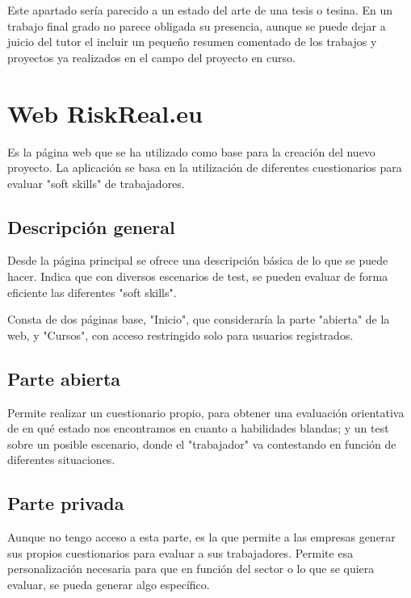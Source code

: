 
Este apartado sería parecido a un estado del arte de una tesis o tesina. En un trabajo final grado no parece obligada su presencia, aunque se puede dejar a juicio del tutor el incluir un pequeño resumen comentado de los trabajos y proyectos ya realizados en el campo del proyecto en curso. 

\section{Web RiskReal.eu}
Es la página web \cite{web:riskreal} que se ha utilizado como base para la creación del nuevo proyecto.
La aplicación se basa en la utilización de diferentes cuestionarios para evaluar "soft skills" de trabajadores.

\subsection{Descripción general}
Desde la página principal se ofrece una descripción básica de lo que se puede hacer.
Indica que con diversos escenarios de test, se pueden evaluar de forma eficiente las diferentes "soft skills".

Consta de dos páginas base, "Inicio", que consideraría la parte "abierta" de la web, y "Cursos", con acceso restringido solo para usuarios registrados.

\subsection{Parte abierta}
Permite realizar un cuestionario propio, para obtener una evaluación orientativa de en qué estado nos encontramos en cuanto a habilidades blandas; y un test sobre un posible escenario, donde el "trabajador" va contestando en función de diferentes situaciones.

\subsection{Parte privada}
Aunque no tengo acceso a esta parte, es la que permite a las empresas generar sus propios cuestionarios para evaluar a sus trabajadores.
Permite esa personalización necesaria para que en función del sector o lo que se quiera evaluar, se pueda generar algo específico.



